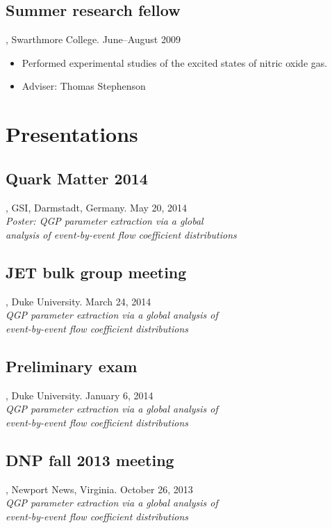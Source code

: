 \documentclass[letterpaper,10pt]{article}
\begin{document}
\subsection{Summer research fellow}, Swarthmore College. \hfill June--August 2009

\begin{itemize}
  \item Performed experimental studies of the excited states of nitric oxide gas.
  \item Adviser:  Thomas Stephenson
\end{itemize}



\pagebreak


\section{Presentations}

\subsection{Quark Matter 2014}, GSI, Darmstadt, Germany. \hfill May 20, 2014 \\
\emph{Poster: QGP parameter extraction via a global \\ analysis of event-by-event flow coefficient distributions}


\subsection{JET bulk group meeting}, Duke University. \hfill March 24, 2014 \\
\emph{QGP parameter extraction via a global analysis of \\ event-by-event flow coefficient distributions}


\subsection{Preliminary exam}, Duke University. \hfill January 6, 2014 \\
\emph{QGP parameter extraction via a global analysis of \\ event-by-event flow coefficient distributions}


\subsection{DNP fall 2013 meeting}, Newport News, Virginia. \hfill October 26, 2013 \\
\emph{QGP parameter extraction via a global analysis of \\ event-by-event flow coefficient distributions}
\end{document}
